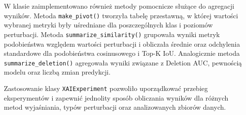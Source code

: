 W klasie zaimplementowano również metody pomocnicze służące do agregacji wyników. Metoda \texttt{make\_pivot()} tworzyła tabelę przestawną, w której wartości wybranej metryki były uśredniane dla poszczególnych klas i poziomów perturbacji. Metoda \texttt{summarize\_similarity()} grupowała wyniki metryk podobieństwa względem wartości perturbacji i obliczała średnie oraz odchylenia standardowe dla podobieństwa cosinusowego i Top-K IoU. Analogicznie metoda \texttt{summarize\_deletion()} agregowała wyniki związane z Deletion AUC, pewnością modelu oraz liczbą zmian predykcji.

Zastosowanie klasy \texttt{XAIExperiment} pozwoliło uporządkować przebieg eksperymentów i zapewnić jednolity sposób obliczania wyników dla różnych metod wyjaśniania, typów perturbacji oraz analizowanych zbiorów danych.